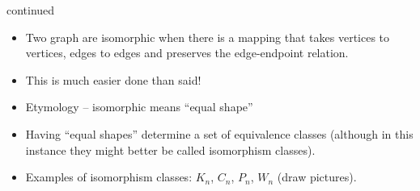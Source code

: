 \documentclass[handout,landscape]{beamer}
\begin{document}
\begin{frame}{continued}
\begin{itemize}
\item Two graph are isomorphic when there is a mapping that takes vertices to vertices, edges to edges and preserves the edge-endpoint relation. \pause
\bigskip
\item This is much easier done than said! \pause
\item Etymology -- isomorphic means ``equal shape'' \pause
\item Having ``equal shapes'' determine a set of equivalence classes (although in this instance they might better be called isomorphism classes). \pause
\item Examples of isomorphism classes: $K_n$, $C_n$, $P_n$, $W_n$ (draw pictures).

\end{itemize}
\end{frame}
\end{document}

